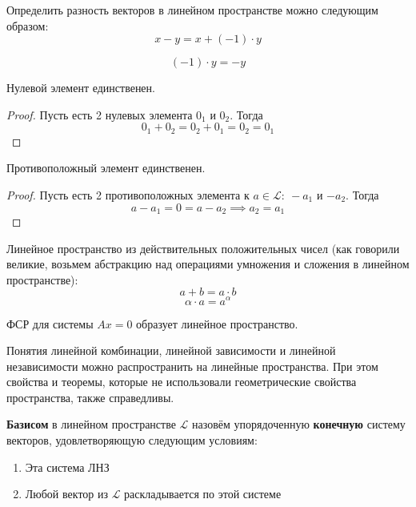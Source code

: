 \documentclass[11pt]{article}
\begin{document}
\begin{remark} Определить разность векторов в линейном пространстве можно следующим образом:
    \[ x - y = x + (-1) \cdot y \]
\end{remark}

\begin{consequence}
    \[(-1) \cdot y = -y\]
\end{consequence}

\begin{consequence}
    Нулевой элемент единственен.
\end{consequence}

\begin{proof}
    Пусть есть 2 нулевых элемента $0_1$ и $0_2$. Тогда
    \[ 0_1 + 0_2 = 0_2 + 0_1 = 0_2 = 0_1\]
\end{proof}

\begin{consequence}
    Противоположный элемент единственен.
\end{consequence}

\begin{proof}
    Пусть есть 2 противоположных элемента к $a \in \mathcal{L}: \ -a_1$ и $-a_2$.
    Тогда \[a - a_1 = 0 = a - a_2 \implies a_2 = a_1\]
\end{proof}

\begin{example}
    Линейное пространство из действительных положительных чисел
    (как говорили великие, возьмем абстракцию над операциями 
    умножения и сложения в линейном пространстве):
    \[ a + b = a \cdot b\] 
    \[ \alpha \cdot a = a^\alpha\]
\end{example}

\begin{statement}
    ФСР для системы $Ax = 0$ образует линейное пространство.
\end{statement}

\begin{remark}
    Понятия линейной комбинации, линейной зависимости и линейной 
    независимости можно распространить на линейные пространства. При 
    этом свойства и теоремы, которые не использовали геометрические свойства 
    пространства, также справедливы.
\end{remark}

\begin{definition}
    \textbf{Базисом} в линейном пространстве $\mathcal{L}$ назовём упорядоченную \textbf{конечную} систему 
    векторов, удовлетворяющую следующим условиям:
    \begin{enumerate}
        \item Эта система ЛНЗ
        \item Любой вектор из $\mathcal{L}$ раскладывается по этой системе
    \end{enumerate}
\end{definition}
\end{document}
